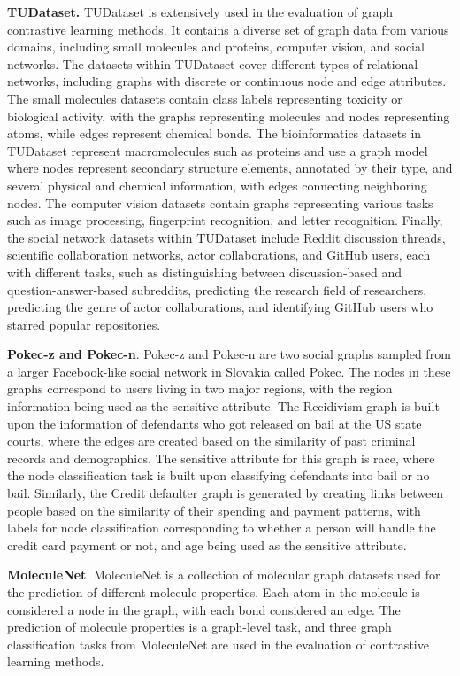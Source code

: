 \documentclass[11pt]{article}
\begin{document}
\textbf{TUDataset.} TUDataset \cite{morris2020tudataset} is extensively used in the evaluation of graph contrastive learning methods. It contains a diverse set of graph data from various domains, including small molecules and proteins, computer vision, and social networks. The datasets within TUDataset cover different types of relational networks, including graphs with discrete or continuous node and edge attributes. The small molecules datasets contain class labels representing toxicity or biological activity, with the graphs representing molecules and nodes representing atoms, while edges represent chemical bonds. The bioinformatics datasets in TUDataset represent macromolecules such as proteins and use a graph model where nodes represent secondary structure elements, annotated by their type, and several physical and chemical information, with edges connecting neighboring nodes. The computer vision datasets contain graphs representing various tasks such as image processing, fingerprint recognition, and letter recognition. Finally, the social network datasets within TUDataset include Reddit discussion threads, scientific collaboration networks, actor collaborations, and GitHub users, each with different tasks, such as distinguishing between discussion-based and question-answer-based subreddits, predicting the research field of researchers, predicting the genre of actor collaborations, and identifying GitHub users who starred popular repositories.

\textbf{Pokec-z and Pokec-n}. Pokec-z and Pokec-n \cite{dai2021say} are two social graphs sampled from a larger Facebook-like social network in Slovakia called Pokec. The nodes in these graphs correspond to users living in two major regions, with the region information being used as the sensitive attribute. The Recidivism graph is built upon the information of defendants who got released on bail at the US state courts, where the edges are created based on the similarity of past criminal records and demographics. The sensitive attribute for this graph is race, where the node classification task is built upon classifying defendants into bail or no bail. Similarly, the Credit defaulter graph is generated by creating links between people based on the similarity of their spending and payment patterns, with labels for node classification corresponding to whether a person will handle the credit card payment or not, and age being used as the sensitive attribute.

\textbf{MoleculeNet}. MoleculeNet \cite{wu2018moleculenet} is a collection of molecular graph datasets used for the prediction of different molecule properties. Each atom in the molecule is considered a node in the graph, with each bond considered an edge. The prediction of molecule properties is a graph-level task, and three graph classification tasks from MoleculeNet are used in the evaluation of contrastive learning methods.
\end{document}
